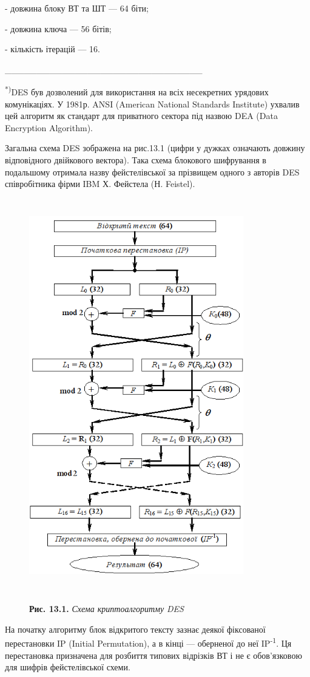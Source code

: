  {}- довжина блоку ВТ та ШТ --- 64 біти;

 {}- довжина ключа --- 56 бітів;

 {}- кількість ітерацій --- 16. 


\bigskip

\_\_\_\_\_\_\_\_\_\_\_\_\_\_\_\_\_\_\_\_\_\_\_\_\_\_\_\_\_\_\_

\textsuperscript{ *)}DES був дозволений для використання на всіх несекретних
урядових комунікаціях. У 1981р. ANSI (American National Standards Institute)
ухвалив цей алгоритм як стандарт для приватного сектора під назвою DEA (Data
Encryption Algorithm).   

Загальна схема DES зображена на рис.13.1 (цифри у дужках означають довжину
відповідного двійкового вектора). Така схема блокового шифрування  в подальшому
отримала назву фейстелівської за прізвищем одного з  авторів DES співробітника
фірми IBM Х. Фейстела (Н. Feistel).

\begin{figure}
\centering
\begin{minipage}{}
 \includegraphics[width=3.6764in,height=6.7484in]{crypt-img/crypt-img295.png} 
\begin{minipage}{3.25in}
\textbf{Рис. 13.1.} \textit{Схема криптоалгоритму }\textit{DES}
\end{minipage}\end{minipage}
\end{figure}
На початку алгоритму блок відкритого тексту зазнає деякої фіксованої
перестановки  IP (Initial Permutation), а в кінці --- оберненої до неї
IP\textsuperscript{{}-1}. Ця перестановка призначена для розбиття типових
відрізків ВТ і не є обов’язковою для шифрів фейстелівської схеми.

